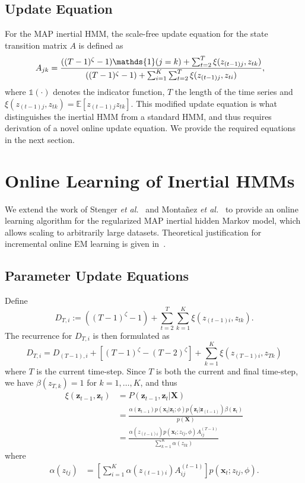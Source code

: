 \documentclass{article}
\begin{document}
\subsection{Update Equation}

For the MAP inertial HMM, the scale-free update equation for the state transition matrix $A$ is defined as
\begin{align}\label{eq:SCALE-FREE-MAP}
  \setlength{\abovedisplayskip}{0pt}
  \setlength{\belowdisplayskip}{0pt}
    A_{jk} &= \frac{((T - 1)^{\zeta}-1){\mathds{1}(j = k)} + \sum_{t=2}^{T} \xi(z_{(t-1)j}, z_{tk})}   
    {((T - 1)^{\zeta} - 1) + \sum_{i=1}^{K}\sum_{t=2}^{T} \xi(z_{(t-1)j}, z_{ti})},
\end{align}
where $\mathds{1}(\cdot)$ denotes the indicator function, $T$ the length of the time series and $\xi(z_{(t-1)j}, z_{tk})=\mathds{E}[z_{(t-1)j}z_{tk}]$. This modified update equation is what distinguishes the inertial HMM from a standard HMM, and thus requires derivation of a novel online update equation. We provide the required equations in the next section.

\section{Online Learning of Inertial HMMs}

We extend the work of Stenger \emph{et
al.}~ and Monta\~nez \emph{et
al.}~ to provide an online learning algorithm for the
regularized MAP inertial hidden Markov model, which allows scaling to arbitrarily large
datasets. Theoretical justification for incremental online EM learning is given
in~\cite{Neal:1999:VEA:308574.308679}.

\subsection{Parameter Update Equations}

Define 
\[
   D_{T,i} := ((T-1)^\zeta -1) + \sum_{t=2}^{T}\sum_{k=1}^{K} \xi(z_{(t-1)i}, z_{tk}).
\]
The recurrence for $D_{T,i}$ is then formulated as
\begin{equation*}
    D_{T,i} = D_{(T-1), i} + [(T-1)^\zeta - (T-2)^\zeta] + \sum_{k=1}^{K}
    \xi(z_{(T-1)i}, z_{Tk})
\end{equation*}
where $T$ is the current time-step. Since $T$ is both the current and final time-step, we have $\beta(z_{T,k}) = 1$ for $k = 1, \ldots, K$, and thus
\begin{align*}
    \xi(\mathbf{z}_{t-1}, \mathbf{z}_{t}) 
            &= P(\mathbf{z}_{t-1}, \mathbf{z}_{t} | \mathbf{X}) \\
            &= \frac{\alpha(\mathbf{z}_{t-1})p(\mathbf{x}_t|\mathbf{z}_t; \phi)p(\mathbf{z}_{t}|\mathbf{z}_{(t-1)})\beta(\mathbf{z}_t)}{p(\mathbf{X})} \\
            &= \frac{\alpha(z_{(t-1)i})p(\mathbf{x}_t; z_{tj}, \phi)A_{ij}^{(T-1)}}{\sum_{k=1}^{K}\alpha(z_{tk})}
\end{align*}
where
\begin{align*}
    \alpha(z_{tj}) &= \left[\sum_{i=1}^{K} \alpha(z_{(t-1)i})A_{ij}^{(t-1)}\right]p(\mathbf{x}_t; z_{tj},\phi).
\end{align*}
\end{document}
